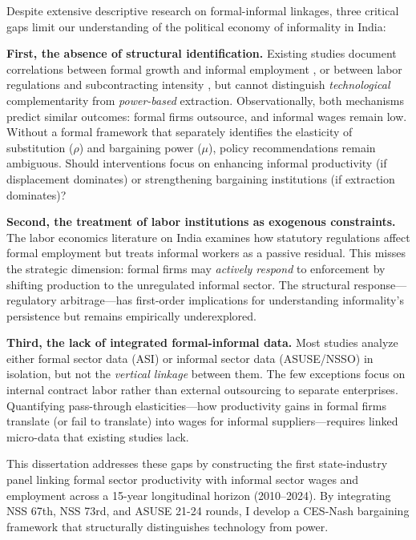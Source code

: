 Despite extensive descriptive research on formal-informal linkages, three critical gaps limit our understanding of the political economy of informality in India:

\textbf{First, the absence of structural identification.} Existing studies document correlations between formal growth and informal employment \autocite{Nataraj2011}, or between labor regulations and subcontracting intensity \autocite{Chaurey2015}, but cannot distinguish \textit{technological} complementarity from \textit{power-based} extraction. Observationally, both mechanisms predict similar outcomes: formal firms outsource, and informal wages remain low. Without a formal framework that separately identifies the elasticity of substitution ($\rho$) and bargaining power ($\mu$), policy recommendations remain ambiguous. Should interventions focus on enhancing informal productivity (if displacement dominates) or strengthening bargaining institutions (if extraction dominates)?

\textbf{Second, the treatment of labor institutions as exogenous constraints.} The labor economics literature on India \autocite{Besley2004, Ahsan2009} examines how statutory regulations affect formal employment but treats informal workers as a passive residual. This misses the strategic dimension: formal firms may \textit{actively respond} to enforcement by shifting production to the unregulated informal sector. The structural response—regulatory arbitrage—has first-order implications for understanding informality's persistence but remains empirically underexplored.

\textbf{Third, the lack of integrated formal-informal data.} Most studies analyze either formal sector data (ASI) or informal sector data (ASUSE/NSSO) in isolation, but not the \textit{vertical linkage} between them. The few exceptions \autocite{Singh2023} focus on internal contract labor rather than external outsourcing to separate enterprises. Quantifying pass-through elasticities—how productivity gains in formal firms translate (or fail to translate) into wages for informal suppliers—requires linked micro-data that existing studies lack.

This dissertation addresses these gaps by constructing the first state-industry panel linking formal sector productivity with informal sector wages and employment across a 15-year longitudinal horizon (2010--2024). By integrating NSS 67th, NSS 73rd, and ASUSE 21-24 rounds, I develop a CES-Nash bargaining framework that structurally distinguishes technology from power.

